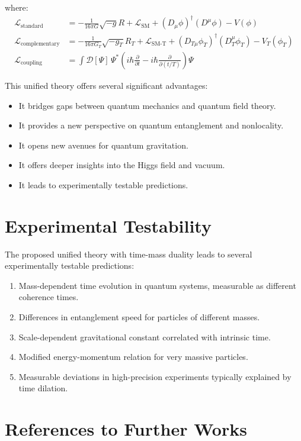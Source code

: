 \documentclass{article}
\begin{document}
where:
\begin{align}
	\mathcal{L}_\text{standard} &= -\frac{1}{16\pi G} \sqrt{-g} R + \mathcal{L}_\text{SM} + (D_\mu \phi)^\dagger (D^\mu \phi) - V(\phi) \\
	\mathcal{L}_\text{complementary} &= -\frac{1}{16\pi G_T} \sqrt{-g_T} R_T + \mathcal{L}_\text{SM-T} + (D_{T\mu} \phi_T)^\dagger (D_T^\mu \phi_T) - V_T(\phi_T) \\
	\mathcal{L}_\text{coupling} &= \int \mathcal{D}[\Psi] \, \Psi^* \left( i\hbar \frac{\partial}{\partial t} - i\hbar \frac{\partial}{\partial (t/T)} \right) \Psi
\end{align}

This unified theory offers several significant advantages:
\begin{itemize}
	\item It bridges gaps between quantum mechanics and quantum field theory.
	\item It provides a new perspective on quantum entanglement and nonlocality.
	\item It opens new avenues for quantum gravitation.
	\item It offers deeper insights into the Higgs field and vacuum.
	\item It leads to experimentally testable predictions.
\end{itemize}

\section{Experimental Testability}

The proposed unified theory with time-mass duality leads to several experimentally testable predictions:

\begin{enumerate}
	\item Mass-dependent time evolution in quantum systems, measurable as different coherence times.
	\item Differences in entanglement speed for particles of different masses.
	\item Scale-dependent gravitational constant correlated with intrinsic time.
	\item Modified energy-momentum relation for very massive particles.
	\item Measurable deviations in high-precision experiments typically explained by time dilation.
\end{enumerate}

\section{References to Further Works}
\end{document}
